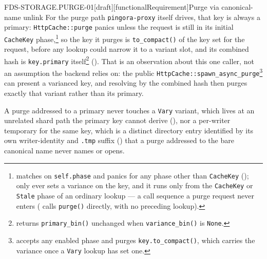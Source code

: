 \begin{requirement}{FDS-STORAGE.PURGE-01}[draft][functionalRequirement]{Purge via canonical-name unlink}
  For the purge path \texttt{pingora-proxy} itself drives, that key is
  always a primary: \texttt{HttpCache::purge} panics unless the request is
  still in its initial \texttt{CacheKey}
  phase,\footnote{
  matches on \texttt{self.phase} and panics for any phase other than
  \texttt{CacheKey} (); only
   ever
  sets a variance on the key, and it runs only from the \texttt{CacheKey} or
  \texttt{Stale} phase of an ordinary lookup --- a call sequence a purge
  request never enters
  (
  calls \texttt{purge()} directly, with no preceding lookup).} so the key it
  purges is \texttt{to\_compact()} of the key set for the request, before any
  lookup could narrow it to a variant slot, and its combined hash is
  \texttt{key.primary}
  itself\footnote{
  returns \texttt{primary\_bin()} unchanged when \texttt{variance\_bin()} is
  \texttt{None}.} (). That is an observation
  about this one caller, not an assumption the backend relies on: the public
  \texttt{HttpCache::spawn\_async\_purge}\footnote{
  accepts any enabled phase and purges \texttt{key.to\_compact()}, which
  carries the variance once a \texttt{Vary} lookup has set one.} can present a
  varianced key, and resolving by the combined hash then purges exactly that
  variant rather than its primary.

  A purge addressed to a primary never touches a \texttt{Vary} variant,
  which lives at an unrelated shard path the primary key cannot derive
  (), nor a per-writer temporary for the
  same key, which is a distinct directory entry identified by its own
  writer-identity and \texttt{.tmp} suffix () that a
  purge addressed to the bare canonical name never names or opens.


\end{requirement}
